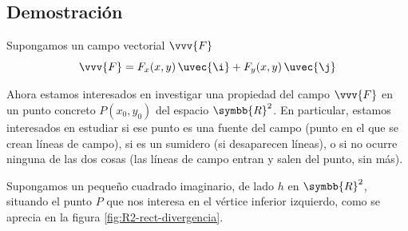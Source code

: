 \subsection{Demostración}
Supongamos un campo vectorial $\vvv{F}$
\[
  \vvv{F} = F_x(x,y)\,\uvec{\i} + F_y(x,y)\,\uvec{\j}
\]

Ahora estamos interesados en investigar una propiedad del campo $\vvv{F}$ en un punto
concreto $P(x_0,y_0)$ del espacio $\symbb{R}^2$. En particular, estamos interesados en
estudiar si ese punto es una fuente del campo (punto en el que se crean líneas de
campo), si es un sumidero (si desaparecen líneas), o si no ocurre ninguna de las
dos cosas (las líneas de campo entran y salen del punto, sin más).

Supongamos un pequeño cuadrado imaginario, de lado $h$ en $\symbb{R}^2$, situando el
punto $P$ que nos interesa en el vértice inferior izquierdo, como se aprecia en la
figura \ref{fig:R2-rect-divergencia}.
